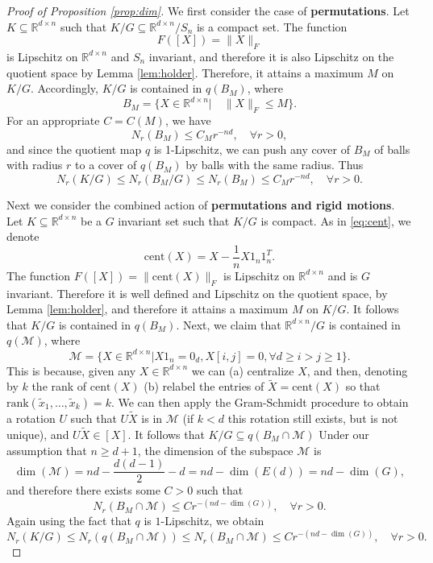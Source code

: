 \documentclass[twoside,11pt]{article}
\newcommand{\M}{\mathcal{M}}
\newcommand{\RR}{\mathbb{R}}
\newcommand{\cent}{\mathrm{cent}}
\begin{document}
\begin{proof}[Proof of Proposition \ref{prop:dim}]
We first consider the case of \textbf{permutations}. Let $K\subseteq \RR^{d\times n}$ such that $K/G\subseteq \RR^{d\times n}/S_n $ is a compact set. The function
$$F([X])=\|X\|_F $$
is Lipschitz on $\RR^{d\times n}$ and $S_n$ invariant, and therefore it is also Lipschitz
 on the quotient space by Lemma \ref{lem:holder}. Therefore, it attains a maximum $M$ on $K/G $. Accordingly, $K/G$ is contained in $q(B_M) $, where 
$$B_M=\{X\in \RR^{d\times n}| \quad \|X\|_F\leq M \} .$$
For an appropriate $C=C(M)$, we have
$$N_r(B_M)\leq C_Mr^{-nd}, \quad \forall r>0 ,$$
and since the quotient map $q$ is 1-Lipschitz, we can push any cover of $B_M$ of balls with radius $r$ to a cover of $q(B_M)$ by balls with the same radius. Thus 
$$N_r(K/G)\leq N_r(B_M/G)\leq N_r(B_M)
\leq C_Mr^{-nd}, \quad \forall r>0 . $$

Next we consider the combined action of \textbf{permutations and rigid motions}. Let $K\subseteq \RR^{d\times n} $ be a $G$ invariant set such that $K/G$ is compact. As in \eqref{eq:cent}, we denote 
\begin{equation*}
\cent(X)=X-\frac{1}{n}X1_n1_n^T. \end{equation*}
The  function  $F([X])=\|\cent(X)\|_F$ is Lipschitz on $\RR^{d\times n}$ and is $G$ invariant. Therefore it is  well defined and Lipschitz on the quotient space, by Lemma \ref{lem:holder}, and therefore it attains a maximum $M$ on $K/G$. It follows that  $K/G $ is contained in  $q(B_M)$. Next, we claim that $\RR^{d\times n}/G $ is  contained in $q(\M)$, where  
$$\mathcal{M}=\{X\in \RR^{d\times n}| X1_n=0_d, X[i,j]=0, \forall d\geq i>j \geq 1  \} .$$
This is because, given any $X\in \RR^{d\times n}$ we can (a)  centralize $X$, and then, denoting by $k$ the rank of $\cent(X)$ (b) relabel the entries of $\tilde X=\cent(X)$ so that $\mathrm{rank}(\tilde x_1,\ldots,\tilde x_k)=k $. We can then apply the Gram-Schmidt procedure to obtain a rotation $U$ such that $U\tilde X$ is in $\M$ (if $k<d$ this rotation still exists, but is not unique), and $U\tilde X\in[X] $. It follows that $K/G\subseteq q(B_M\cap \M) $
Under our assumption that $n\geq d+1 $, the dimension of the subspace $\M$ is 
$$\dim(\mathcal{M})=nd-\frac{d(d-1)}{2}-d=nd-\dim(E(d))=nd-\dim(G),$$
and therefore there exists some $C>0$ such that 
$$N_r(B_M\cap \M)\leq Cr^{-(nd-\dim(G))}, \quad \forall r>0. $$
Again using the fact that $q$ is $1$-Lipschitz, we obtain 
$$N_r(K/G)\leq N_r(q(B_M\cap \M))\leq N_r(B_M\cap \M) \leq Cr^{-(nd-\dim(G))}, \quad \forall r>0. $$

 \end{proof}

%
\end{document}
